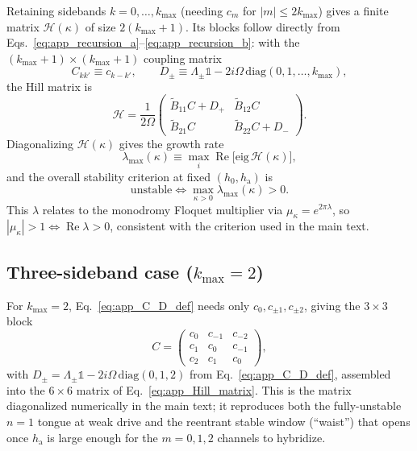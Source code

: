 Retaining sidebands $k=0,\dots,k_\text{max}$ (needing $c_m$ for $|m|\le2k_\text{max}$) gives a finite matrix $\mathcal H(\kappa)$ of size $2(k_\text{max}+1)$. Its blocks follow directly from Eqs.~\eqref{eq:app_recursion_a}--\eqref{eq:app_recursion_b}: with the $(k_\text{max}{+}1)\times(k_\text{max}{+}1)$ coupling matrix
%
\begin{equation}
    C_{kk'} \equiv c_{k-k'}, \qquad D_\pm \equiv \Lambda_\pm\mathbb{1} - 2i\Omega\,\mathrm{diag}(0,1,\dots,k_\text{max}),
    \label{eq:app_C_D_def}
\end{equation}
%
the Hill matrix is
%
\begin{equation}
    \mathcal H = \frac{1}{2\Omega}
    \begin{pmatrix}
    \tilde B_{11}C + D_+ & \tilde B_{12}C \\
    \tilde B_{21}C & \tilde B_{22}C + D_-
    \end{pmatrix}.
    \label{eq:app_Hill_matrix}
\end{equation}
%
Diagonalizing $\mathcal H(\kappa)$ gives the growth rate
%
\begin{equation}
    \lambda_\text{max}(\kappa) \equiv \max_i \operatorname{Re}\big[\mathrm{eig}\,\mathcal H(\kappa)\big],
    \label{eq:app_growth_rate}
\end{equation}
%
and the overall stability criterion at fixed $(h_0,h_\text{a})$ is
%
\begin{equation}
    \text{unstable} \iff \max_{\kappa>0}\lambda_\text{max}(\kappa) > 0.
    \label{eq:app_overall_criterion}
\end{equation}
%
This $\lambda$ relates to the monodromy Floquet multiplier via $\mu_\kappa=e^{2\pi\lambda}$, so $|\mu_\kappa|>1\iff\operatorname{Re}\lambda>0$, consistent with the criterion used in the main text.

\subsection{Three-sideband case ($k_\text{max}=2$)}
\label{app:kmax2}

For $k_\text{max}=2$, Eq.~\eqref{eq:app_C_D_def} needs only $c_0,c_{\pm1},c_{\pm2}$, giving the $3\times3$ block
%
\begin{equation}
    C = \begin{pmatrix} c_0 & c_{-1} & c_{-2}\\ c_1 & c_0 & c_{-1} \\ c_2 & c_1 & c_0 \end{pmatrix},
    \label{eq:app_C_block}
\end{equation}
%
with $D_\pm=\Lambda_\pm\mathbb 1-2i\Omega\,\mathrm{diag}(0,1,2)$ from Eq.~\eqref{eq:app_C_D_def}, assembled into the $6\times6$ matrix of Eq.~\eqref{eq:app_Hill_matrix}. This is the matrix diagonalized numerically in the main text; it reproduces both the fully-unstable $n=1$ tongue at weak drive and the reentrant stable window (``waist'') that opens once $h_\text{a}$ is large enough for the $m=0,1,2$ channels to hybridize.


